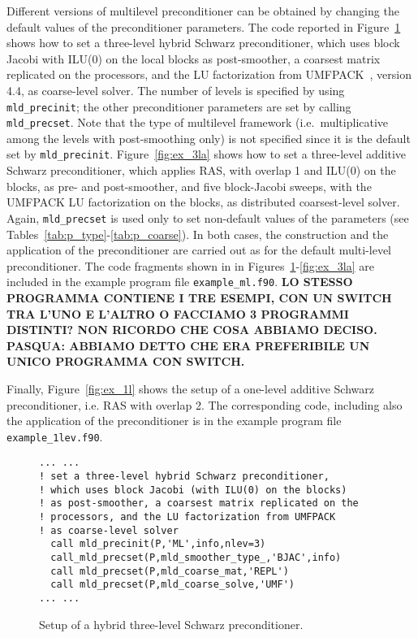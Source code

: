 Different versions of multilevel preconditioner can be obtained by changing
the default values of the preconditioner parameters. The code reported in
Figure~\ref{fig:ex_3lh} shows how to set a three-level hybrid Schwarz
preconditioner, which uses block Jacobi with ILU(0) on the
local blocks as post-smoother, a coarsest matrix replicated on the processors,
and the LU factorization from UMFPACK~\cite{UMFPACK}, version 4.4, as coarse-level solver.
The number of levels is specified by using \verb|mld_precinit|; the other
preconditioner parameters are set by calling \verb|mld_precset|. Note that
the type of multilevel framework (i.e.\ multiplicative among the levels
with post-smoothing only) is not specified since it is the default 
set by \verb|mld_precinit|. Figure~\ref{fig:ex_3la} shows how to
set a three-level additive Schwarz preconditioner,
which applies RAS, with overlap 1 and ILU(0) on the blocks,
as pre- and post-smoother, and five block-Jacobi sweeps, with
the UMFPACK LU factorization on the blocks, as distributed coarsest-level
solver. Again, \verb|mld_precset| is used only to set
non-default values of the parameters (see Tables~\ref{tab:p_type}-\ref{tab:p_coarse}).
In both cases, the construction and the application of the preconditioner
are carried out as for the default multi-level preconditioner.
The code fragments shown in in Figures~\ref{fig:ex_3lh}-\ref{fig:ex_3la} are
included in the example program file \verb|example_ml.f90|.
\textbf{LO STESSO PROGRAMMA CONTIENE I TRE ESEMPI, CON UN SWITCH TRA L'UNO E L'ALTRO
O FACCIAMO 3 PROGRAMMI DISTINTI? NON RICORDO CHE COSA ABBIAMO DECISO.
PASQUA: ABBIAMO DETTO CHE ERA PREFERIBILE UN UNICO PROGRAMMA CON SWITCH.}

Finally, Figure~\ref{fig:ex_1l} shows the setup of a one-level
additive Schwarz preconditioner, i.e. RAS with overlap 2. The corresponding code,
including also the application of the preconditioner is in the example
program file \verb|example_1lev.f90|.

\begin{figure}[tbp]
\begin{center}
{\small
\begin{verbatim}
... ...
! set a three-level hybrid Schwarz preconditioner,
! which uses block Jacobi (with ILU(0) on the blocks)
! as post-smoother, a coarsest matrix replicated on the
! processors, and the LU factorization from UMFPACK
! as coarse-level solver
  call mld_precinit(P,'ML',info,nlev=3)
  call_mld_precset(P,mld_smoother_type_,'BJAC',info)
  call mld_precset(P,mld_coarse_mat,'REPL')
  call mld_precset(P,mld_coarse_solve,'UMF')
... ...
\end{verbatim}
}
\caption{Setup of a hybrid three-level Schwarz preconditioner.\label{fig:ex_3lh}}
\end{center}
\end{figure}

